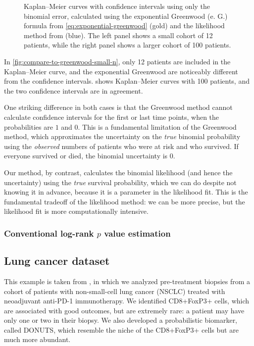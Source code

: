 \documentclass[article]{jss}
\newcommand{\KM}{Kaplan--Meier} %
\begin{document}
\begin{figure}
\begin{subfigure}[t]{0.49\textwidth}
  \caption{\label{fig:compare-to-greenwood-large-n}}
\end{subfigure}
\caption{\label{fig:compare-to-greenwood} \KM{} curves with confidence intervals using only the binomial error, calculated using the exponential Greenwood (e. G.) formula from \cref{eq:exponential-greenwood} (gold) and the likelihood method from  (blue).  The left panel shows a small cohort of 12 patients, while the right panel shows a larger cohort of 100 patients.}
\end{figure}

In \cref{fig:compare-to-greenwood-small-n}, only 12 patients are included in the \KM{} curve, and the exponential Greenwood are noticeably different from the  confidence intervals.   shows \KM{} curves with 100 patients, and the two confidence intervals are in agreement.

One striking difference in both cases is that the Greenwood method cannot calculate confidence intervals for the first or last time points, when the probabilities are \(1\) and \(0\).  This is a fundamental limitation of the Greenwood method, which approximates the uncertainty on the \emph{true} binomial probability using the \emph{observed} numbers of patients who were at risk and who survived.  If everyone survived or died, the binomial uncertainty is \(0\).

Our method, by contrast, calculates the binomial likelihood (and hence the uncertainty) using the \emph{true} survival probability, which we can do despite not knowing it in advance, because it is a parameter in the likelihood fit.  This is the fundamental tradeoff of the likelihood method: we can be more precise, but the likelihood fit is more computationally intensive.

\subsubsection[Conventional log-rank p value estimation]{Conventional log-rank \(p\) value estimation}

\subsection{Lung cancer dataset}

This example is taken from \citet{DONUTS}, in which we analyzed pre-treatment biopsies from a cohort of patients with non-small-cell lung cancer (NSCLC) treated with neoadjuvant anti-PD-1 immunotherapy.  We identified CD8+FoxP3+ cells, which are associated with good outcomes, but are extremely rare: a patient may have only one or two in their biopsy.  We also developed a probabilistic biomarker, called DONUTS, which resemble the niche of the CD8+FoxP3+ cells but are much more abundant.
\end{document}
